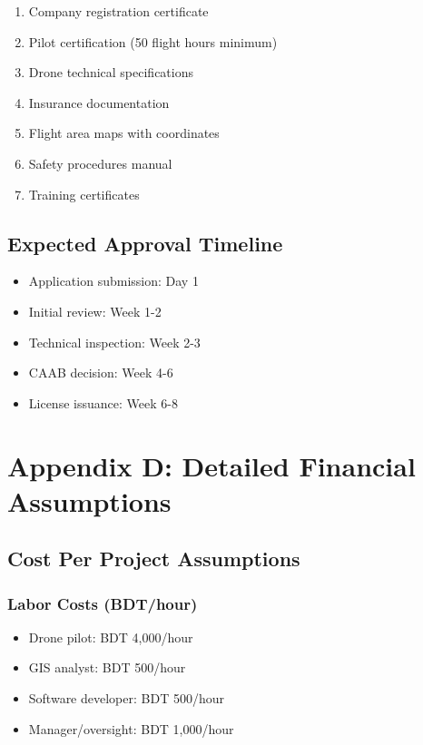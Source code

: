 \begin{enumerate}
    \item Company registration certificate
    \item Pilot certification (50 flight hours minimum)
    \item Drone technical specifications
    \item Insurance documentation
    \item Flight area maps with coordinates
    \item Safety procedures manual
    \item Training certificates
\end{enumerate}

\section*{Expected Approval Timeline}

\begin{itemize}
    \item Application submission: Day 1
    \item Initial review: Week 1-2
    \item Technical inspection: Week 2-3
    \item CAAB decision: Week 4-6
    \item License issuance: Week 6-8
\end{itemize}

\chapter*{Appendix D: Detailed Financial Assumptions}

\section*{Cost Per Project Assumptions}

\subsection*{Labor Costs (BDT/hour)}

\begin{itemize}
    \item Drone pilot: BDT 4,000/hour
    \item GIS analyst: BDT 500/hour
    \item Software developer: BDT 500/hour
    \item Manager/oversight: BDT 1,000/hour
\end{itemize}

